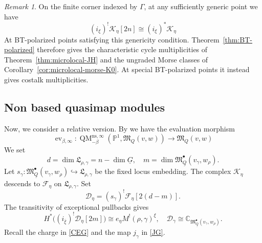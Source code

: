 \documentclass[11pt,reqno]{amsart}
\theoremstyle{definition}
\theoremstyle{remark}
\newtheorem{Remark}[Theorem]{Remark}
\def\bbC{\mathbb C}
\def\dG{\underline G}
\def\dQ{\underline Q}
\def\M{\mathfrak M}
\begin{document}
\begin{Remark}
On the finite corner indexed by $\Gamma$, at any sufficiently generic point we have
$$(i_\xi)^!\mathcal K_\eta[2n]\cong (i_\xi)^*\mathcal K_\eta$$
At BT-polarized points
satisfying this genericity condition.
Theorem~\ref{thm:BT-polarized}
therefore gives the characteristic cycle multiplicities of
Theorem~\ref{thm:microlocal-JH} and the ungraded Morse classes of
Corollary~\ref{cor:microlocal-morse-K0}. At special BT-polarized
points it instead gives costalk multiplicities. 
\end{Remark}



\subsection{Non based quasimap modules}
Now, we consider a relative version. 
By \cite[\S0.1.6.4]{BT26} we have the evaluation morphism
\[
 \operatorname{ev}_{\beta,\infty}:\operatorname{QM}_{-\beta}^{\mathrm{ns},\infty}(\mathbb P^1,\M_Q(v,w))
 \longrightarrow \M_Q(v,w)
\]
We set
$$d=\dim \mathfrak L_{\rho,\gamma}=n-\dim\dG
,\quad
m=\dim \M_{\dQ}^\bullet(v_\gamma,w_\rho).$$
Let $s_\gamma:\M_{\dQ}^\bullet(v_\gamma,w_\rho)\hookrightarrow \mathfrak L_{\rho,\gamma}$ be the fixed locus embedding.
The complex $\mathcal K_\eta$ descends to $\mathcal F_\eta$ on $\mathfrak L_{\rho,\gamma}$.
Set
\[
 \mathcal D_\eta=(s_\gamma)^!\mathcal F_\eta[2(d-m)].
\]
The transitivity of exceptional pullbacks gives
\[
 H^*\bigl((i_{\bar\xi})^!\mathcal D_\eta[2m]\bigr)
 \cong e_\eta M^!(\rho,\gamma)^\xi,
 \quad \mathcal D_\gamma\cong\bbC_{\M_{\dQ}^\bullet(v_\gamma,w_\rho)}.
\]
Recall the charge in \eqref{CEG} and the map $j_\gamma$ in \eqref{JG}.
\end{document}
